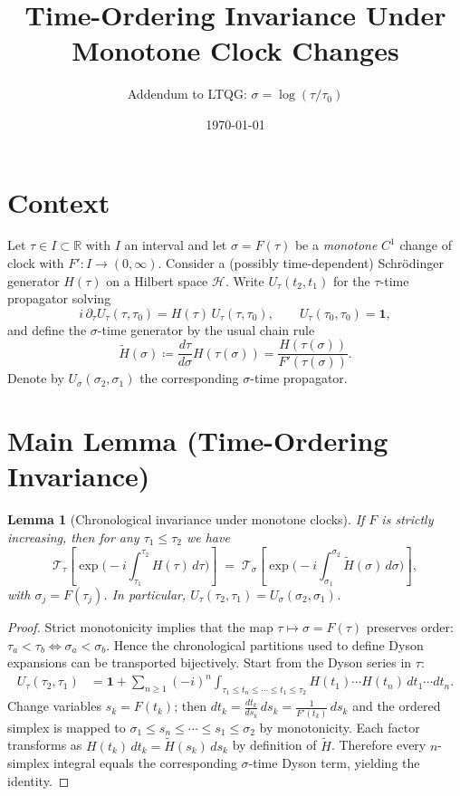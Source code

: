 \documentclass[11pt]{article}
\title{Time-Ordering Invariance Under Monotone Clock Changes}
\author{Addendum to LTQG: $\sigma=\log(\tau/\tau_0)$}
\date{\today}
\newtheorem{lemma}{Lemma}
\theoremstyle{definition}
\begin{document}
\maketitle

\section*{Context}
Let $\tau\in I\subset\mathbb{R}$ with $I$ an interval and let $\sigma=F(\tau)$ be a \emph{monotone} $C^1$ change of clock with $F':I\to(0,\infty)$.
Consider a (possibly time-dependent) Schr\"odinger generator $H(\tau)$ on a Hilbert space $\mathcal{H}$.
Write $U_\tau(t_2,t_1)$ for the $\tau$-time propagator solving
\begin{equation}
 i\,\partial_\tau U_\tau(\tau,\tau_0)=H(\tau)\,U_\tau(\tau,\tau_0),\qquad U_\tau(\tau_0,\tau_0)=\mathbf{1},
\end{equation}
and define the $\sigma$-time generator by the usual chain rule
\begin{equation}
 \tilde H(\sigma)\coloneqq \frac{d\tau}{d\sigma} H(\tau(\sigma)) = \frac{H(\tau(\sigma))}{F'(\tau(\sigma))}.
\end{equation}
Denote by $U_\sigma(\sigma_2,\sigma_1)$ the corresponding $\sigma$-time propagator.

\section*{Main Lemma (Time-Ordering Invariance)}
\begin{lemma}[Chronological invariance under monotone clocks]\label{lem:order}
If $F$ is strictly increasing, then for any $\tau_1\le \tau_2$ we have
\begin{equation}
 \mathcal{T}_\tau\!\left[\exp\!\Big(-i\!\int_{\tau_1}^{\tau_2}\! H(\tau)\,d\tau\Big)\right]
 \;=\;
 \mathcal{T}_\sigma\!\left[\exp\!\Big(-i\!\int_{\sigma_1}^{\sigma_2}\! \tilde H(\sigma)\,d\sigma\Big)\right],
\end{equation}
with $\sigma_j=F(\tau_j)$. In particular, $U_\tau(\tau_2,\tau_1)=U_\sigma(\sigma_2,\sigma_1)$.
\end{lemma}

\begin{proof}
Strict monotonicity implies that the map $\tau\mapsto\sigma=F(\tau)$ preserves order: $\tau_a<\tau_b\iff\sigma_a<\sigma_b$.
Hence the chronological partitions used to define Dyson expansions can be transported bijectively.
Start from the Dyson series in $\tau$:
\begin{align}
U_\tau(\tau_2,\tau_1) &= \mathbf{1} + \sum_{n\ge1} (-i)^n \!\!\!\!\!\!
\int_{\tau_1\le t_n\le\cdots\le t_1\le \tau_2} \!\!\!\!\!\!\!\! H(t_1)\cdots H(t_n)\, dt_1\cdots dt_n .
\end{align}
Change variables $s_k=F(t_k)$; then $dt_k = \frac{dt_k}{ds_k}\,ds_k=\frac{1}{F'(t_k)}\,ds_k$ and the ordered simplex is mapped to
$\sigma_1\le s_n\le\cdots\le s_1\le \sigma_2$ by monotonicity.
Each factor transforms as $H(t_k)\,dt_k = \tilde H(s_k)\,ds_k$ by definition of $\tilde H$.
Therefore every $n$-simplex integral equals the corresponding $\sigma$-time Dyson term, yielding the identity.
\end{proof}
\end{document}
